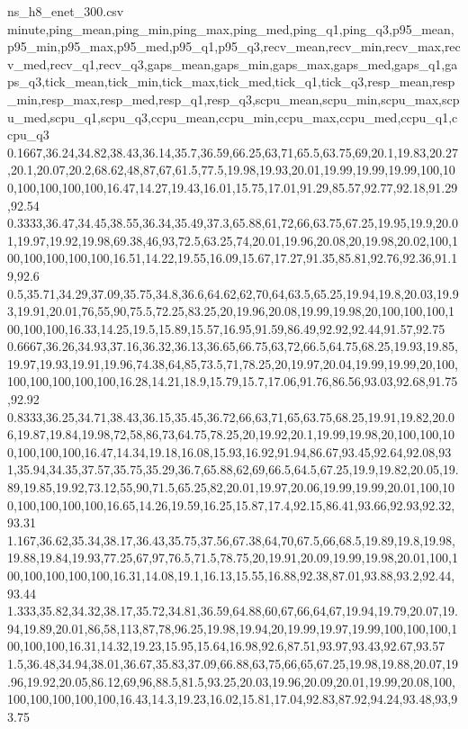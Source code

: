 \begin{filecontents*}[overwrite]{ns_h8_enet_300.csv}
minute,ping_mean,ping_min,ping_max,ping_med,ping_q1,ping_q3,p95_mean,p95_min,p95_max,p95_med,p95_q1,p95_q3,recv_mean,recv_min,recv_max,recv_med,recv_q1,recv_q3,gaps_mean,gaps_min,gaps_max,gaps_med,gaps_q1,gaps_q3,tick_mean,tick_min,tick_max,tick_med,tick_q1,tick_q3,resp_mean,resp_min,resp_max,resp_med,resp_q1,resp_q3,scpu_mean,scpu_min,scpu_max,scpu_med,scpu_q1,scpu_q3,ccpu_mean,ccpu_min,ccpu_max,ccpu_med,ccpu_q1,ccpu_q3
0.1667,36.24,34.82,38.43,36.14,35.7,36.59,66.25,63,71,65.5,63.75,69,20.1,19.83,20.27,20.1,20.07,20.2,68.62,48,87,67,61.5,77.5,19.98,19.93,20.01,19.99,19.99,19.99,100,100,100,100,100,100,16.47,14.27,19.43,16.01,15.75,17.01,91.29,85.57,92.77,92.18,91.29,92.54
0.3333,36.47,34.45,38.55,36.34,35.49,37.3,65.88,61,72,66,63.75,67.25,19.95,19.9,20.01,19.97,19.92,19.98,69.38,46,93,72.5,63.25,74,20.01,19.96,20.08,20,19.98,20.02,100,100,100,100,100,100,16.51,14.22,19.55,16.09,15.67,17.27,91.35,85.81,92.76,92.36,91.19,92.6
0.5,35.71,34.29,37.09,35.75,34.8,36.6,64.62,62,70,64,63.5,65.25,19.94,19.8,20.03,19.93,19.91,20.01,76,55,90,75.5,72.25,83.25,20,19.96,20.08,19.99,19.98,20,100,100,100,100,100,100,16.33,14.25,19.5,15.89,15.57,16.95,91.59,86.49,92.92,92.44,91.57,92.75
0.6667,36.26,34.93,37.16,36.32,36.13,36.65,66.75,63,72,66.5,64.75,68.25,19.93,19.85,19.97,19.93,19.91,19.96,74.38,64,85,73.5,71,78.25,20,19.97,20.04,19.99,19.99,20,100,100,100,100,100,100,16.28,14.21,18.9,15.79,15.7,17.06,91.76,86.56,93.03,92.68,91.75,92.92
0.8333,36.25,34.71,38.43,36.15,35.45,36.72,66,63,71,65,63.75,68.25,19.91,19.82,20.06,19.87,19.84,19.98,72,58,86,73,64.75,78.25,20,19.92,20.1,19.99,19.98,20,100,100,100,100,100,100,16.47,14.34,19.18,16.08,15.93,16.92,91.94,86.67,93.45,92.64,92.08,93
1,35.94,34.35,37.57,35.75,35.29,36.7,65.88,62,69,66.5,64.5,67.25,19.9,19.82,20.05,19.89,19.85,19.92,73.12,55,90,71.5,65.25,82,20.01,19.97,20.06,19.99,19.99,20.01,100,100,100,100,100,100,16.65,14.26,19.59,16.25,15.87,17.4,92.15,86.41,93.66,92.93,92.32,93.31
1.167,36.62,35.34,38.17,36.43,35.75,37.56,67.38,64,70,67.5,66,68.5,19.89,19.8,19.98,19.88,19.84,19.93,77.25,67,97,76.5,71.5,78.75,20,19.91,20.09,19.99,19.98,20.01,100,100,100,100,100,100,16.31,14.08,19.1,16.13,15.55,16.88,92.38,87.01,93.88,93.2,92.44,93.44
1.333,35.82,34.32,38.17,35.72,34.81,36.59,64.88,60,67,66,64,67,19.94,19.79,20.07,19.94,19.89,20.01,86,58,113,87,78,96.25,19.98,19.94,20,19.99,19.97,19.99,100,100,100,100,100,100,16.31,14.32,19.23,15.95,15.64,16.98,92.6,87.51,93.97,93.43,92.67,93.57
1.5,36.48,34.94,38.01,36.67,35.83,37.09,66.88,63,75,66,65,67.25,19.98,19.88,20.07,19.96,19.92,20.05,86.12,69,96,88.5,81.5,93.25,20.03,19.96,20.09,20.01,19.99,20.08,100,100,100,100,100,100,16.43,14.3,19.23,16.02,15.81,17.04,92.83,87.92,94.24,93.48,93,93.75

\end{filecontents*}
